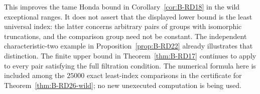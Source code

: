 \begin{remark}
This improves the tame Honda bound in
Corollary~\ref{cor:B-RD18} in the wild exceptional ranges.
It does not assert that the displayed lower bound is the least
universal index: the latter concerns arbitrary pairs of groups
with isomorphic truncations, and the comparison group need not
be constant. The independent characteristic-two example in
Proposition~\ref{prop:B-RD22} already illustrates that distinction.
The finite upper bound in Theorem~\ref{thm:B-RD17} continues to
apply to every pair satisfying the full filtration condition.
The numerical formula here is included among the $25000$ exact
least-index comparisons in the certificate for
Theorem~\ref{thm:B-RD26-wild}; no new unexecuted computation is
being used.
\end{remark}
